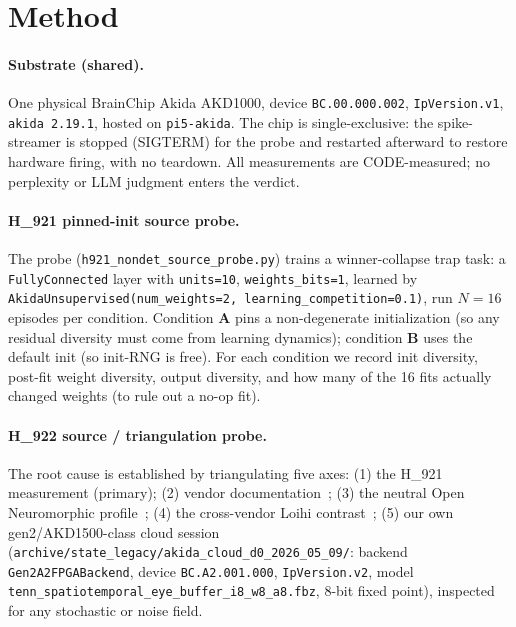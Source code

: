 \documentclass[11pt,a4paper]{article}
\begin{document}
\section{Method}
\label{sec:method}

\paragraph{Substrate (shared).} One physical BrainChip Akida AKD1000,
device \texttt{BC.00.000.002}, \texttt{IpVersion.v1}, \texttt{akida 2.19.1},
hosted on \texttt{pi5-akida}. The chip is single-exclusive: the
spike-streamer is stopped (SIGTERM) for the probe and restarted afterward to
restore hardware firing, with no teardown. All measurements are
CODE-measured; no perplexity or LLM judgment enters the verdict.

\paragraph{H\_921 pinned-init source probe.} The probe
(\texttt{h921\_nondet\_source\_probe.py}) trains a winner-collapse trap
task: a \texttt{FullyConnected} layer with \texttt{units=10},
\texttt{weights\_bits=1}, learned by \texttt{AkidaUnsupervised(num\_weights=2,
learning\_competition=0.1)}, run \(N=16\) episodes per condition. Condition
\textbf{A} pins a non-degenerate initialization (so any residual diversity
must come from learning dynamics); condition \textbf{B} uses the default
init (so init-RNG is free). For each condition we record init diversity,
post-fit weight diversity, output diversity, and how many of the 16 fits
actually changed weights (to rule out a no-op fit).

\paragraph{H\_922 source / triangulation probe.} The root cause is
established by triangulating five axes:
(1) the H\_921 measurement (primary);
(2) vendor documentation~\cite{brainchipAKD1000Brief,brainchipCommercialization};
(3) the neutral Open Neuromorphic profile~\cite{openNeuromorphicAkida};
(4) the cross-vendor Loihi contrast~\cite{openNeuromorphicLoihi2,shresthaLoihi2};
(5) our own gen2/AKD1500-class cloud session
(\texttt{archive/state\_legacy/akida\_cloud\_d0\_2026\_05\_09/}: backend
\texttt{Gen2A2FPGABackend}, device \texttt{BC.A2.001.000},
\texttt{IpVersion.v2}, model
\texttt{tenn\_spatiotemporal\_eye\_buffer\_i8\_w8\_a8.fbz}, 8-bit fixed
point), inspected for any stochastic or noise field.
\end{document}
